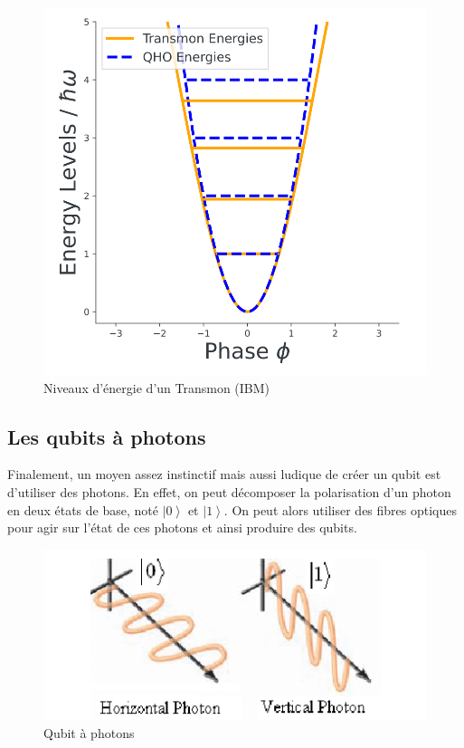 \documentclass{article}
\begin{document}
\begin{multicols}{2}
\begin{figure}[H]
    \centering
    \includegraphics[width = \columnwidth]{fig/transfon.png}
    \caption{Niveaux d'énergie d'un Transmon (IBM)}
    \label{fig:Transmon}
\end{figure}



\subsection{Les qubits à photons}

Finalement, un moyen assez instinctif mais aussi ludique de créer un qubit est d'utiliser des photons.
En effet, on peut décomposer la polarisation d'un photon en deux états de base, noté $\left|0\right>$ et $\left|1\right>$.
On peut alors utiliser des fibres optiques pour agir sur l'état de ces photons et ainsi produire des qubits.

\begin{figure}[H]
    \centering
    \includegraphics[width = \columnwidth]{fig/Single-photon-qubit.png}
    \caption{Qubit à photons}
    \label{fig:Qubit_a_photons}
\end{figure}


\end{multicols}
\end{document}
